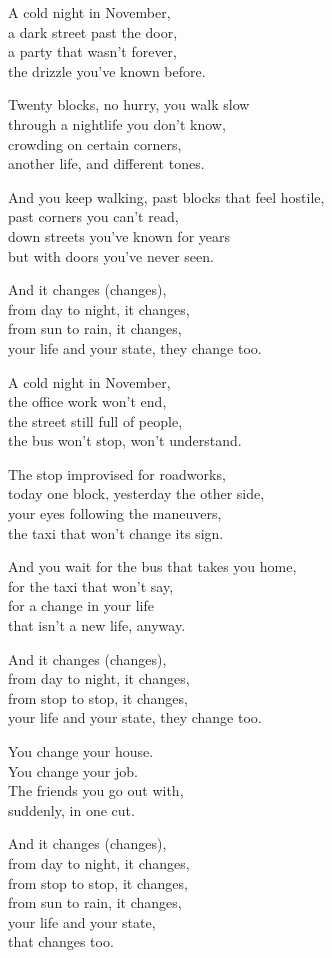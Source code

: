 \begin{lyrics}
A cold night in November,\\
a dark street past the door,\\
a party that wasn't forever,\\
the drizzle you've known before.

Twenty blocks, no hurry, you walk slow\\
through a nightlife you don't know,\\
crowding on certain corners,\\
another life, and different tones.

And you keep walking, past blocks that feel hostile,\\
past corners you can't read,\\
down streets you've known for years\\
but with doors you've never seen.

And it changes (changes),\\
from day to night, it changes,\\
from sun to rain, it changes,\\
your life and your state, they change too.

A cold night in November,\\
the office work won't end,\\
the street still full of people,\\
the bus won't stop, won't understand.

The stop improvised for roadworks,\\
today one block, yesterday the other side,\\
your eyes following the maneuvers,\\
the taxi that won't change its sign.

And you wait for the bus that takes you home,\\
for the taxi that won't say,\\
for a change in your life\\
that isn't a new life, anyway.

And it changes (changes),\\
from day to night, it changes,\\
from stop to stop, it changes,\\
your life and your state, they change too.

You change your house.\\
You change your job.\\
The friends you go out with,\\
suddenly, in one cut.

And it changes (changes),\\
from day to night, it changes,\\
from stop to stop, it changes,\\
from sun to rain, it changes,\\
your life and your state,\\
that changes too.
\end{lyrics}

